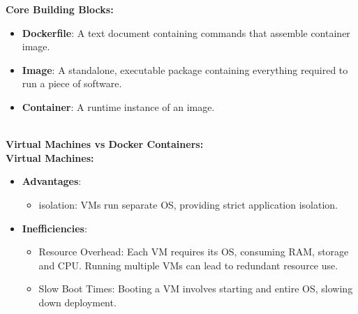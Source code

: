 \documentclass{article}
\begin{document}
\textbf{Core Building Blocks:} 
\begin{itemize}
\color{blue}
\item \textbf{Dockerfile}: A text document containing commands that assemble container image.
\item \textbf{Image}: A standalone, executable package containing everything required to run a piece of software.
\item \textbf{Container}: A runtime instance of an image.
\end{itemize}
\\
\textbf{Virtual Machines vs Docker Containers:} \\
\textbf{Virtual Machines:}
\begin{itemize}
\color{blue}
\item \textbf{Advantages}: 
\begin{itemize}
    \item isolation: VMs run separate OS, providing strict application isolation.
\end{itemize}
\item \textbf{Inefficiencies}: 
\begin{itemize}
    \item Resource Overhead: Each VM requires its OS, consuming RAM, storage and CPU. Running multiple VMs can lead to redundant resource use.
    \item Slow Boot Times: Booting a VM involves starting and entire OS, slowing down deployment.
\end{itemize}
\end{itemize}
\end{document}
